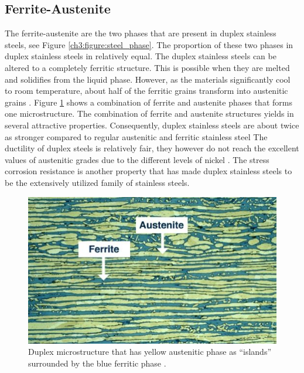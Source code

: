 \documentclass[12pt]{report}
\begin{document}
\subsection{Ferrite-Austenite}
The ferrite-austenite are the two phases that are present in duplex stainless steels, see Figure \ref{ch3:figure:steel_phase}. The proportion of these two phases in duplex stainless steels in relatively equal. The duplex stainless steels can be altered to a completely ferritic structure. This is possible when they are melted and solidifies from the liquid phase\cite{xiao2006challenge}.  However, as the materials significantly cool to room temperature, about half of the ferritic grains transform into austenitic grains \cite{steels3practical}. Figure \ref{ch3:figure:duplex_microstructure} shows a combination of ferrite and austenite phases that forms one microstructure.
The combination of ferrite and austenite structures yields in several attractive properties. Consequently, duplex stainless steels are about twice as stronger compared to regular austenitic and ferritic stainless steel \cite{steels3practical} The ductility of duplex steels is relatively fair, they however do not reach the excellent values of austenitic grades due to the different levels of nickel \cite{molabe2018determining}. The stress corrosion resistance is another property that has made duplex stainless steels to be the extensively utilized family of stainless steels. 

\begin{figure}[H]
    \centering
    \includegraphics[width=.6\textwidth]{duplex_microstructure_that_has_yellow_austenitic_phase.jpg}
    \caption{Duplex microstructure that has yellow austenitic phase as “islands” surrounded by the blue ferritic phase \cite{steels3practical}.}
    \label{ch3:figure:duplex_microstructure}
\end{figure}
\end{document}
